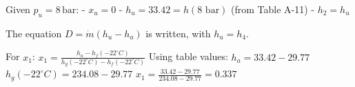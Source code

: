 Given \( p_u = 8 \, \text{bar} \):  
- \( x_u = 0 \)  
- \( h_u = 33.42 = h(\text{8 bar}) \) (from Table A-11)  
- \( h_2 = h_u \)  

The equation \( D = \dot{m}(h_u - h_a) \) is written, with \( h_u = h_4 \).  

For \( x_1 \):  
\( x_1 = \frac{h_a - h_f(-22^\circ C)}{h_g(-22^\circ C) - h_f(-22^\circ C)} \)  
Using table values:  
\( h_a = 33.42 - 29.77 \)  
\( h_g(-22^\circ C) = 234.08 - 29.77 \)  
\( x_1 = \frac{33.42 - 29.77}{234.08 - 29.77} = 0.337 \)